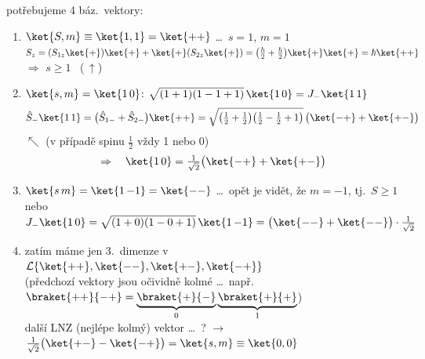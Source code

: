 \begin{priklad}
potřebujeme 4 báz.\ vektory:
\begin{enumerate}[label=\textcircled{\arabic*}]
  \item $\ket{S,m} \equiv \ket{1,1} = \ket{++}$ \quad \dots\ $s = 1$, $m = 1$ \\
        $S_z = (S_{1z}\ket{+})\ket{+} + \ket{+}(S_{2z}\ket{+}) = \big(\frac{\hbar}{2} + \frac{\hbar}{2}\big)\ket{+}\ket{+} = \hbar\ket{++}$
        \quad $\Rightarrow$ $s \geq 1$ \ (\,$\uparrow$)
  \item $\ket{s,m} = \ket{1\,0}$: \quad $\sqrt{(1+1)(1-1+1)}\,\ket{1\,0} = J_-\ket{1\,1}$
        \[
          \hat S_-\ket{1\,1} = \big(\hat S_{1-} + \hat S_{2-}\big)\ket{++}
          = \sqrt{\big(\tfrac12+\tfrac12\big)\big(\tfrac12-\tfrac12+1\big)}\,\big(\ket{-+} + \ket{+-}\big)
        \]
        \quad $\nwarrow$ (v případě spinu $\frac12$ vždy 1 nebo 0)
        \[ \Rightarrow\quad \ket{1\,0} = \tfrac{1}{\sqrt2}\big(\ket{-+} + \ket{+-}\big) \]
  \item $\ket{s\,m} = \ket{1\,{-1}} = \ket{--}$ \quad \dots\ opět je vidět, že $m = -1$, tj.\ $S \geq 1$ \\
        nebo \quad $J_-\ket{1\,0} = \sqrt{(1+0)(1-0+1)}\,\ket{1\,{-1}} = \big(\ket{--} + \ket{--}\big)\cdot\frac{1}{\sqrt2}$
  \item zatím máme jen 3.\ dimenze v $\mathcal{L}\{\ket{++},\ket{--},\ket{+-},\ket{-+}\}$ \\
        (předchozí vektory jsou očividně kolmé \dots\ např.\
        $\braket{++}{-+} = \underbrace{\braket{+}{-}}_{0}\underbrace{\braket{+}{+}}_{1}$) \\
        další LNZ (nejlépe kolmý) vektor \dots\ ? $\to$ \quad
        $\frac{1}{\sqrt2}\big(\ket{+-} - \ket{-+}\big) = \ket{s,m} \equiv \ket{0,0}$
\end{enumerate}


\end{priklad}
